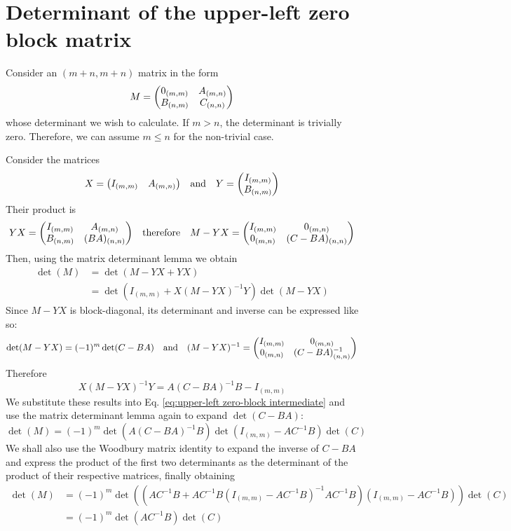 \documentclass[12pt]{article}
\begin{document}
	\section{Determinant of the upper-left zero block matrix}
	
	Consider an $(m+n,m+n)$ matrix in the form
	\begin{equation}
	M = \mqty(0_{(m,m)} & A_{(m, n)} \\ B_{(n, m)} & C_{(n, n)})
	\end{equation}
	whose determinant we wish to calculate. If $m>n$, the determinant is trivially zero. Therefore, we can assume $m\leq n$ for the non-trivial case.
	
	Consider the matrices
	\begin{equation}
	X = \mqty(I_{(m,m)} & A_{(m, n)})\qq{and}Y = \mqty(I_{(m,m)} \\ B_{(n, m)})
	\end{equation}
	Their product is
	\begin{equation}
	YX = \mqty(I_{(m,m)} & A_{(m, n)} \\ B_{(n, m)} & (BA)_{(n, n)})\qq{therefore}M-YX=\mqty(I_{(m,m)} & 0_{(m, n)} \\ 0_{(m, n)} & (C - BA)_{(n, n)})
	\end{equation}
	Then, using the matrix determinant lemma we obtain
	\begin{align}\label{eq:upper-left zero-block intermediate}
	\det(M)&=\det(M-YX+YX)\nonumber\\
	&= \det(I_{(m, m)}+X(M-YX)^{-1}Y)\det(M-YX)
	\end{align}
	Since $M-YX$ is block-diagonal, its determinant and inverse can be expressed like so:
	\begin{equation}
	\det(M-YX)=(-1)^m\det(C-BA)\qq{and} (M-YX)^{-1}=\mqty(I_{(m,m)} & 0_{(m, n)} \\ 0_{(m, n)} & (C - BA)^{-1}_{(n, n)})
	\end{equation}
	Therefore
	\begin{equation}
	X(M-YX)^{-1}Y=A(C-BA)^{-1}B-I_{(m,m)}
	\end{equation}
	We substitute these results into Eq. \ref{eq:upper-left zero-block intermediate} and use the matrix determinant lemma again to expand $\det(C-BA)$:
	\begin{equation}
	\det(M)=(-1)^m \det(A(C-BA)^{-1}B)\det(I_{(m,m)}-AC^{-1}B)\det(C)
	\end{equation}
	We shall also use the Woodbury matrix identity to expand the inverse of $C-BA$ and express the product of the first two determinants as the determinant of the product of their respective matrices, finally obtaining
	\begin{align}
	\det(M)&=(-1)^m \det((AC^{-1}B+AC^{-1}B(I_{(m,m)}-AC^{-1}B)^{-1}AC^{-1}B)(I_{(m,m)}-AC^{-1}B))\det(C)\nonumber\\
	&= (-1)^m \det(AC^{-1}B)\det(C)
	\end{align}
	
\end{document}
